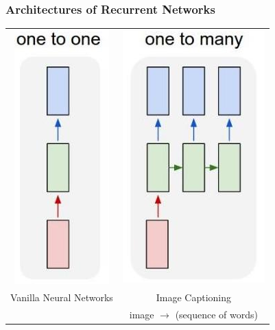 \documentclass[fullscreen=true, bookmarks=true, hyperref={pdfencoding=unicode}]{beamer}
\begin{document}

\begin{frame}
\frametitle{Architectures of Recurrent Networks}
   \begin{center}
       \begin{tabular}{cc}
         \includegraphics[keepaspectratio,
                          width=0.2\paperwidth]{one-to-one.jpg} &
         \includegraphics[keepaspectratio,
                          width=0.3\paperwidth]{one-to-many.jpg} \\
         Vanilla Neural Networks & Image Captioning \\
          & image $\to$ (sequence of words)
       \end{tabular}
   \end{center}
\end{frame}
\end{document}
